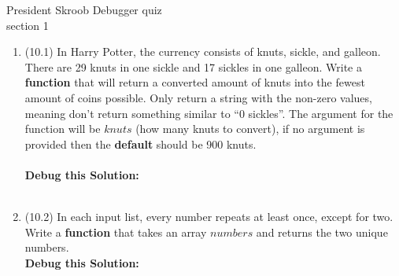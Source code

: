 \documentclass{article}
\begin{document}
\pagebreak
President Skroob \hfill Debugger quiz\\
section 1\\
\begin{enumerate}
\item (10.1) 
		In Harry Potter, the currency consists of knuts, sickle, and galleon. There are 29 knuts in 
		one sickle and 17 sickles in one galleon. Write a \textbf{function} that will return a 
		converted amount of knuts into the fewest amount of coins possible. Only return a string 
		with the non-zero values, meaning don't return something similar to ``0 sickles''. The 
		argument for the function will be $knuts$ (how many knuts to convert), if no argument is 
		provided then the \textbf{default} should be 900 knuts. \\ \\
		\textbf{Debug this Solution:}\\
		\mbox{ \hspace*{0.25in}	}

\pagebreak



\item (10.2) 	
		In each input list, every number repeats at least once, except for two. Write a \textbf{function} 
		that takes an array $numbers$ and returns the two unique numbers.\\

		\textbf{Debug this Solution:}\\
		\mbox{ \hspace*{0.25in}	}

\pagebreak



\end{enumerate}
\pagebreak
\end{document}

